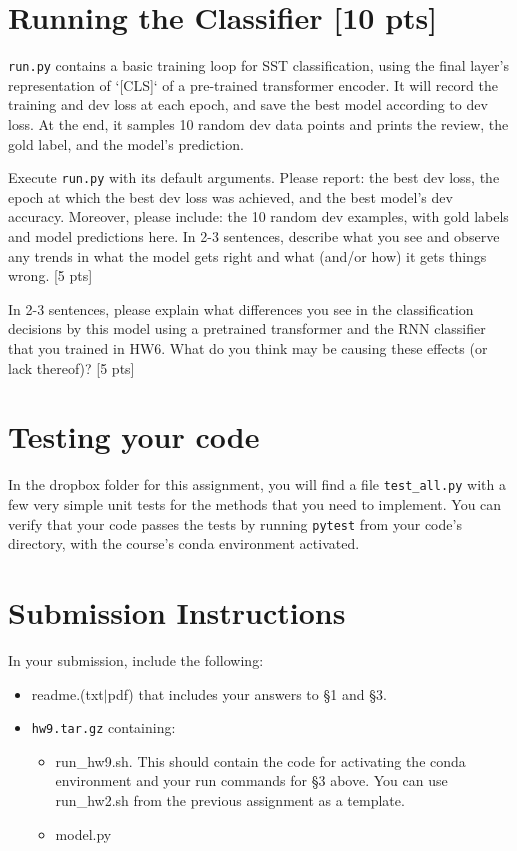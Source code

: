 \documentclass[11pt]{article}
\begin{document}
\section{Running the Classifier [10 pts]}

\texttt{run.py} contains a basic training loop for SST classification, using the final layer's representation of `[CLS]` of a pre-trained transformer encoder. It will record the training and dev loss at each epoch, and save the best model according to dev loss.  At the end, it samples 10 random dev data points and prints the review, the gold label, and the model's prediction.

\vspace{2em}
 Execute \texttt{run.py} with its default arguments.  Please report: the best dev loss, the epoch at which the best dev loss was achieved, and the best model's dev accuracy.  Moreover, please include: the 10 random dev examples, with gold labels and model predictions here.  In 2-3 sentences, describe what you see and observe any trends in what the model gets right and what (and/or how) it gets things wrong. \hfill [5 pts]

\vspace{2em}
 In 2-3 sentences, please explain what differences you see in the classification decisions by this model using a pretrained transformer and the RNN classifier that you trained in HW6. What do you think may be causing these effects (or lack thereof)? \hfill [5 pts]


\section{Testing your code}

In the dropbox folder for this assignment, you will find a file \texttt{test\_all.py} with a few very simple unit tests for the methods that you need to implement.  You can verify that your code passes the tests by running \texttt{pytest} from your code's directory, with the course's conda environment activated.


\section*{Submission Instructions}

In your submission, include the following:
\begin{itemize}
  \item readme.(txt$\mid$pdf) that includes your answers to \S1 and \S3. 
  \item \texttt{hw9.tar.gz} containing:
  \begin{itemize}
    \item run\_hw9.sh.  This should contain the code for activating the conda environment and your run commands for \S3 above.  You can use run\_hw2.sh from the previous assignment as a template.
    \item model.py
  \end{itemize}
\end{itemize}
\end{document}
